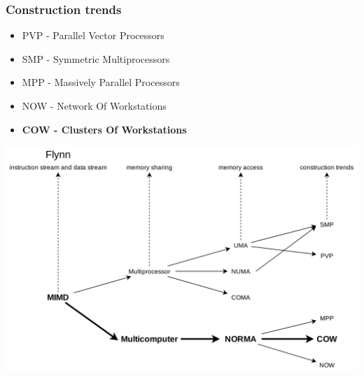 \documentclass{beamer}
\begin{document}
\begin{frame}
  \frametitle{Construction trends}
  \begin{itemize}
    \item PVP - Parallel Vector Processors
    \item SMP - Symmetric Multiprocessors
    \item MPP - Massively Parallel Processors
    \item NOW - Network Of Workstations
    \item \textbf{COW - Clusters Of Workstations}
  \end{itemize}

\end{frame}

\begin{frame}
  \includegraphics[width=\textwidth]{./images/classifications.png}
\end{frame}
\end{document}

